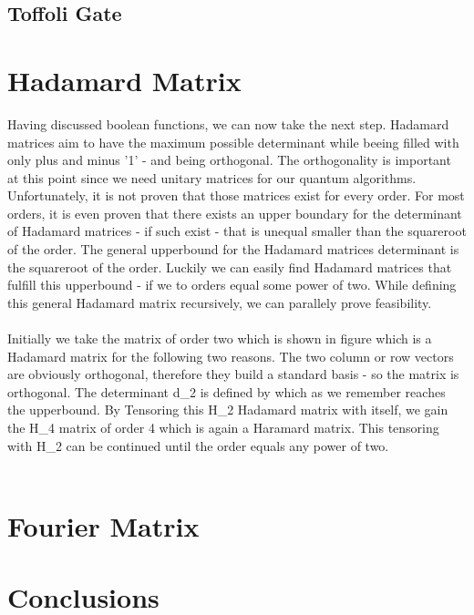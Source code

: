 \documentclass[oneside]{thesisclass}
\begin{document}
\section{Toffoli Gate}

\chapter{Hadamard Matrix}
Having discussed boolean functions, we can now take the next step.
Hadamard matrices aim to have the maximum possible determinant while beeing filled with only plus and minus '1' - and being orthogonal.
The orthogonality is important at this point since we need unitary matrices for our quantum algorithms.
Unfortunately, it is not proven that those matrices exist for every order.
For most orders, it is even proven that there exists an upper boundary for the determinant of Hadamard matrices - if such exist - that is unequal smaller than the squareroot of the order.
The general upperbound for the Hadamard matrices determinant is the squareroot of the order.
Luckily we can easily find Hadamard matrices that fulfill%
this upperbound - if we %
to orders equal some power of two.
While defining this general Hadamard matrix recursively, we can parallely prove feasibility.\\
\\Initially we take the matrix of order two which is shown in figure %
which is a Hadamard matrix for the following two reasons.
The two column or row vectors are obviously orthogonal, therefore they build a standard basis - so the matrix is orthogonal.
The determinant d_2 is defined by %
which as we remember reaches the upperbound.
By Tensoring this H_2 Hadamard matrix with itself, we gain the H_4 matrix of order 4 which is again a Haramard matrix.
This tensoring with H_2 can be continued until the order equals any power of two.\\
\\%

\chapter{Fourier Matrix}

\chapter{Conclusions}




\end{document}
